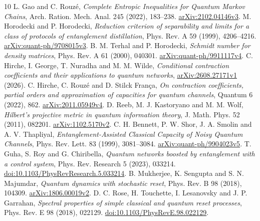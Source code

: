 \documentclass[11pt]{article}
\begin{document}
\begin{thebibliography}{10}
 L. Gao and C. Rouz\'e, \emph{Complete Entropic Inequalities for Quantum Markov Chains}, Arch. Ration. Mech. Anal. 245 (2022), 183--238. \href{https://arxiv.org/abs/2102.04146v3}{arXiv:2102.04146v3}.
 M. Horodecki and P. Horodecki, \emph{Reduction criterion of separability and limits for a class of protocols of entanglement distillation}, Phys. Rev. A 59 (1999), 4206--4216. \href{https://arxiv.org/abs/quant-ph/9708015v3}{arXiv:quant-ph/9708015v3}.
 B. M. Terhal and P. Horodecki, \emph{Schmidt number for density matrices}, Phys. Rev. A 61 (2000), 040301. \href{https://arxiv.org/abs/quant-ph/9911117v4}{arXiv:quant-ph/9911117v4}.
 C. Hirche, I. George, T. Nuradha and M. M. Wilde, \emph{Conditional contraction coefficients and their applications to quantum networks}, \href{https://arxiv.org/abs/2608.27171v1}{arXiv:2608.27171v1} (2026).
 C. Hirche, C. Rouz\'e and D. Stilck Fran\c ca, \emph{On contraction coefficients, partial orders and approximation of capacities for quantum channels}, Quantum 6 (2022), 862. \href{https://arxiv.org/abs/2011.05949v4}{arXiv:2011.05949v4}.
 D. Reeb, M. J. Kastoryano and M. M. Wolf, \emph{Hilbert's projective metric in quantum information theory}, J. Math. Phys. 52 (2011), 082201. \href{https://arxiv.org/abs/1102.5170v2}{arXiv:1102.5170v2}.
 C. H. Bennett, P. W. Shor, J. A. Smolin and A. V. Thapliyal, \emph{Entanglement-Assisted Classical Capacity of Noisy Quantum Channels}, Phys. Rev. Lett. 83 (1999), 3081--3084. \href{https://arxiv.org/abs/quant-ph/9904023v5}{arXiv:quant-ph/9904023v5}.
 T. Guha, S. Roy and G. Chiribella, \emph{Quantum networks boosted by entanglement with a control system}, Phys. Rev. Research 5 (2023), 033214. \href{https://doi.org/10.1103/PhysRevResearch.5.033214}{doi:10.1103/PhysRevResearch.5.033214}.
 B. Mukherjee, K. Sengupta and S. N. Majumdar, \emph{Quantum dynamics with stochastic reset}, Phys. Rev. B 98 (2018), 104309. \href{https://arxiv.org/abs/1806.00019v2}{arXiv:1806.00019v2}.
 D. C. Rose, H. Touchette, I. Lesanovsky and J. P. Garrahan, \emph{Spectral properties of simple classical and quantum reset processes}, Phys. Rev. E 98 (2018), 022129. \href{https://doi.org/10.1103/PhysRevE.98.022129}{doi:10.1103/PhysRevE.98.022129}.
\end{thebibliography}
\end{document}
